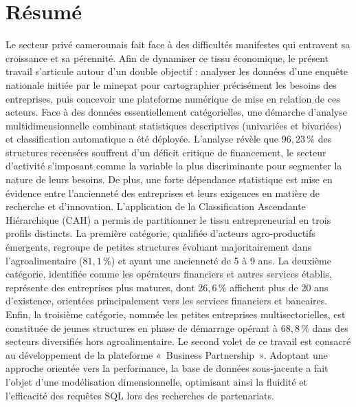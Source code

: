 \documentclass[12pt, a4paper, oneside]{report}
\begin{document}
	\tableofcontents
	
\printglossary[type=\acronymtype, title={Liste des abréviations}]

\chapter*{Résumé}
\thispagestyle{plain}
Le secteur privé camerounais fait face à des difficultés manifestes qui entravent sa croissance et sa pérennité. Afin de dynamiser ce tissu économique, le présent travail s'articule autour d'un double objectif : analyser les données d'une enquête nationale initiée par le \gls{minepat} pour cartographier précisément les besoins des entreprises, puis concevoir une plateforme numérique de mise en relation de ces acteurs. Face à des données essentiellement catégorielles, une démarche d'analyse multidimensionnelle combinant statistiques descriptives (univariées et bivariées) et classification automatique a été déployée. L'analyse révèle que $96{,}23\,\%$ des structures recensées souffrent d'un déficit critique de financement, le secteur d'activité s'imposant comme la variable la plus discriminante pour segmenter la nature de leurs besoins. De plus, une forte dépendance statistique est mise en évidence entre l'ancienneté des entreprises et leurs exigences en matière de recherche et d'innovation. L'application de la Classification Ascendante Hiérarchique (CAH) a permis de partitionner le tissu entrepreneurial en trois profils distincts. La première catégorie, qualifiée d'acteurs agro-productifs émergents, regroupe de petites structures évoluant majoritairement dans l'agroalimentaire ($81{,}1\,\%$) et ayant une ancienneté de 5 à 9 ans. La deuxième catégorie, identifiée comme les opérateurs financiers et autres services établis, représente des entreprises plus matures, dont $26{,}6\,\%$ affichent plus de 20 ans d'existence, orientées principalement vers les services financiers et bancaires. Enfin, la troisième catégorie, nommée les petites entreprises multisectorielles, est constituée de jeunes structures en phase de démarrage opérant à $68{,}8\,\%$ dans des secteurs diversifiés hors agroalimentaire. Le second volet de ce travail est consacré au développement de la plateforme «~Business Partnership~». Adoptant une approche orientée vers la performance, la base de données sous-jacente a fait l'objet d'une modélisation dimensionnelle, optimisant ainsi la fluidité et l'efficacité des requêtes SQL lors des recherches de partenariats.
\end{document}
